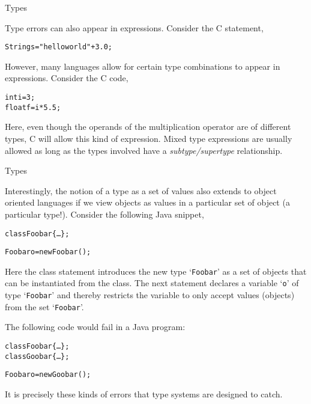 \documentclass{beamer}
\begin{document}
\begin{frame}[fragile]{Types}

\small
Type errors can also appear in expressions.  Consider the C statement,
{\scriptsize
\begin{alltt}
  String s = "hello world" + 3.0;
\end{alltt}
}
However, many languages allow for certain type combinations to appear in expressions.
Consider the C code,
{\scriptsize
\begin{alltt}
  int i = 3;
  float f = i * 5.5;
\end{alltt}
}
Here, even though the operands of the multiplication operator are of different types, C will allow this kind of expression.
Mixed type expressions are usually allowed as long as the types involved have a {\em subtype/supertype} relationship.
\end{frame}

\begin{frame}[fragile]{Types}

\small
Interestingly, the notion of a type as a set of values also extends to object oriented languages
if we view objects as values in a particular set of object (a particular type!).
Consider the following Java snippet,
{\scriptsize
\begin{alltt}
class Foobar \{\ldots\};

Foobar o = new Foobar();
\end{alltt}
}
Here the class statement introduces the new type `{\tt Foobar}' as a set of objects that can be instantiated from the
class.  The next statement declares a variable `{\tt o}' of type `{\tt Foobar}' and thereby restricts the variable to only
accept values (objects) from the set `{\tt Foobar}'.

\vspace{.1in}
The following code would fail in a Java program:
{\scriptsize
\begin{alltt}
class Foobar \{\ldots\};
class Goobar \{\ldots\};

Foobar o = new Goobar();
\end{alltt}
}
It is precisely these kinds of errors that type systems are designed to catch.
\end{frame}
\end{document}
